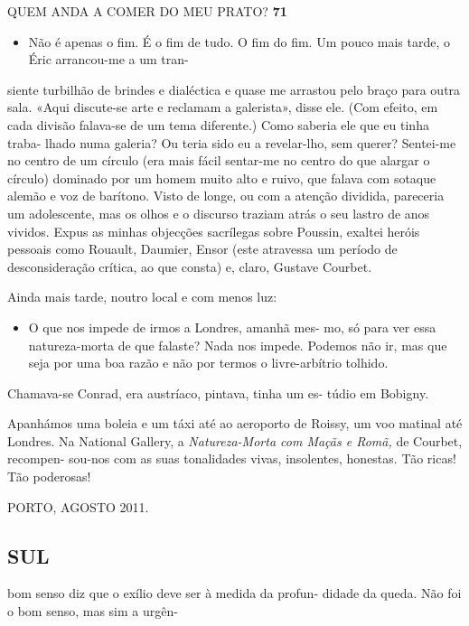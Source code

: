 QUEM ANDA A COMER DO MEU PRATO? \textbf{71}

\begin{itemize}
\tightlist
\item
  Não é apenas o fim. É o fim de tudo. O fim do fim. Um pouco mais
  tarde, o Éric arrancou-me a um tran-
\end{itemize}

siente turbilhão de brindes e dialéctica e quase me arrastou pelo braço
para outra sala. «Aqui discute-se arte e reclamam a galerista», disse
ele. (Com efeito, em cada divisão falava-se de um tema diferente.) Como
saberia ele que eu tinha traba- lhado numa galeria? Ou teria sido eu a
revelar-lho, sem querer? Sentei-me no centro de um círculo (era mais
fácil sentar-me no centro do que alargar o círculo) dominado por um
homem muito alto e ruivo, que falava com sotaque alemão e voz de
barítono. Visto de longe, ou com a atenção dividida, pareceria um
adolescente, mas os olhos e o discurso traziam atrás o seu lastro de
anos vividos. Expus as minhas objecções sacrílegas sobre Poussin,
exaltei heróis pessoais como Rouault, Daumier, Ensor (este atravessa um
período de desconsideração crítica, ao que consta) e, claro, Gustave
Courbet.

Ainda mais tarde, noutro local e com menos luz:

\begin{itemize}
\tightlist
\item
  O que nos impede de irmos a Londres, amanhã mes- mo, só para ver essa
  natureza-morta de que falaste? Nada nos impede. Podemos não ir, mas
  que seja por uma boa razão e não por termos o livre-arbítrio tolhido.
\end{itemize}

Chamava-se Conrad, era austríaco, pintava, tinha um es- túdio em
Bobigny.

Apanhámos uma boleia e um táxi até ao aeroporto de Roissy, um voo
matinal até Londres. Na National Gallery, a \emph{Natureza-Morta com
Maçãs e Romã, }de Courbet, recompen- sou-nos com as suas tonalidades
vivas, insolentes, honestas. Tão ricas! Tão poderosas!

PORTO, AGOSTO 2011.


\subsection{SUL}

bom senso diz que o exílio deve ser à medida da profun- didade da queda.
Não foi o bom senso, mas sim a urgên-

